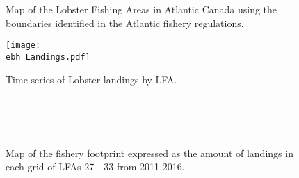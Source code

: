 \documentclass[11pt]{article}
\newcommand{\e}{/backup/bio_data/bio.lobster/figures/} %
\newcommand{\ebh}{/backup/bio_data/bio.lobster/figures/LFA2733Framework2018/} %
\begin{document}
\begin{landscape}
\begin{figure}
\centering
    \caption{Map of the Lobster Fishing Areas in Atlantic Canada using the boundaries identified in the Atlantic fishery regulations.}

\end{figure}
\end{landscape}

   \begin{figure}
    \centering
        \texttt{[image: \\ebh Landings.pdf]}
        \caption{Time series of Lobster landings by LFA.}

    \end{figure}


  \begin{figure}
        \centering
                \\
                \\
                \\
        
         \caption{Map of the fishery footprint expressed as the amount of landings in each grid of LFAs 27 - 33 from 2011-2016.}
        \end{figure}
\end{document}
